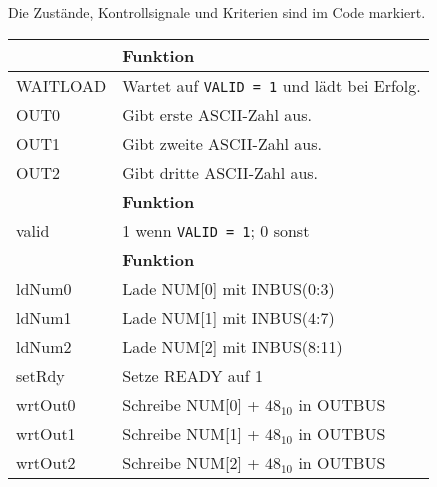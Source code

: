 \documentclass{CInf_practice}
\begin{document}



\newpage
{}

Die Zustände, Kontrollsignale und Kriterien sind im Code markiert.

\begin{center}
   \begin{tabularx}{.8\textwidth}{|L|X|}
      \hline
       & \textbf{Funktion} \\ \hline
      WAITLOAD  & Wartet auf \texttt{VALID = 1} und lädt bei Erfolg. \\
      OUT0      & Gibt erste ASCII-Zahl aus.\\
      OUT1      & Gibt zweite ASCII-Zahl aus.\\
      OUT2      & Gibt dritte ASCII-Zahl aus.\\
      \hline
       & \textbf{Funktion} \\ \hline
      valid                           & 1 wenn \texttt{VALID = 1}; 0 sonst \\
      \hline
       & \textbf{Funktion} \\ \hline
      ldNum0                                & Lade NUM[0] mit INBUS(0:3)\\
      ldNum1                                & Lade NUM[1] mit INBUS(4:7)\\
      ldNum2                                & Lade NUM[2] mit INBUS(8:11)\\
      setRdy                                & Setze READY auf 1\\
      wrtOut0                               & Schreibe NUM[0] + $48_{10}$ in OUTBUS\\
      wrtOut1                               & Schreibe NUM[1] + $48_{10}$ in OUTBUS\\
      wrtOut2                               & Schreibe NUM[2] + $48_{10}$ in OUTBUS\\
      \hline
   \end{tabularx}
\end{center}
\end{document}
